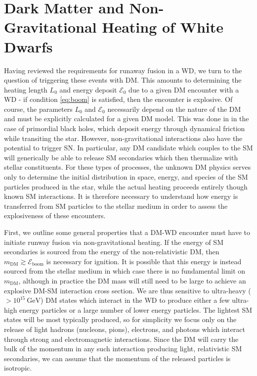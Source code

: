 \documentclass[twocolumn,showpacs,preprintnumbers,amsmath,amssymb,prd]{revtex4}
\newcommand{\Ez}{\mathcal{E}_0}
\newcommand{\Eboom}{\mathcal{E}_\text{boom}}
\newcommand{\GeV}{\text{GeV}}
\begin{document}
\section{Dark Matter and Non-Gravitational Heating of White Dwarfs}
\label{sec:SMHeating}

Having reviewed the requirements for runaway fusion in a WD, we turn to the question of triggering these events with DM. 
This amounts to determining the heating length $L_0$ and energy deposit $\Ez$ due to a given DM encounter with a WD - if condition \eqref{eq:boom} is satisfied, then the encounter is explosive.
Of course, the parameters $L_0$ and $\Ez$ necessarily depend on the nature of the DM and must be explicitly calculated for a given DM model. 
This was done in \cite{Graham:2015apa} in the case of primordial black holes, which deposit energy through dynamical friction while transiting the star.
However, non-gravitational interactions also have the potential to trigger SN. 
In particular, any DM candidate which couples to the SM will generically be able to release SM secondaries which then thermalize with stellar constituents. 
For these types of processes, the unknown DM physics serves only to determine the initial distribution in space, energy, and species of the SM particles produced in the star, while the actual heating proceeds entirely though known SM interactions. 
It is therefore necessary to understand how energy is transferred from SM particles to the stellar medium in order to assess the explosiveness of these encounters.

First, we outline some general properties that a DM-WD encounter must have to initiate runway fusion via non-gravitational heating.
If the energy of SM secondaries is sourced from the energy of the non-relativistic DM, then $m_\text{DM} \gtrsim \Eboom$ is necessary for ignition. 
It is possible that this energy is instead sourced from the stellar medium in which case there is no fundamental limit on $m_\text{DM}$, although in practice the DM mass will still need to be large to achieve an explosive DM-SM interaction cross section. 
We are thus sensitive to ultra-heavy ($>10^{15} ~\GeV$) DM states which interact in the WD to produce either a few ultra-high energy particles or a large number of lower energy particles. 
The lightest SM states will be most typically produced, so for simplicity we focus only on the release of light hadrons (nucleons, pions), electrons, and photons which interact through strong and electromagnetic interactions. 
Since the DM will carry the bulk of the momentum in any such interaction producing light, relativistic SM secondaries, we can assume that the momentum of the released particles is isotropic. 
\end{document}

